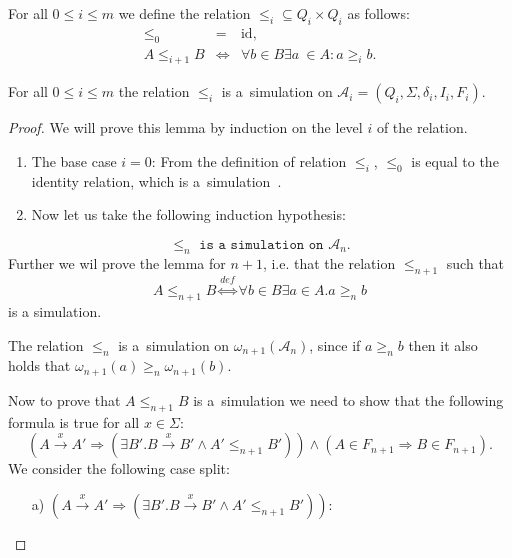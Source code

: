 \begin{defz}\label{simulation-definition}
 For all $0 \leq i \leq m$ we define the relation $\leq_i \subseteq Q_i \times
 Q_i$ as follows:
 \begin{eqnarray}
  \leq_0 & = & \text{id},\\
  A \leq_{i+1} B & \Leftrightarrow & \forall b \in B \exists a~\in A: a \geq_i
  b.
 \end{eqnarray}
\end{defz}

\begin{lemma}
 For all $0 \leq i \leq m$ the relation $\leq_i$ is a~simulation on
 $\mathcal{A}_i = (Q_i, \Sigma, \delta_i, I_i, F_i)$.
\end{lemma}
\begin{proof}
 We will prove this lemma by induction on the level $i$ of the relation.
 
 \begin{enumerate}
   \item The base case $i = 0$: From the definition of relation $\leq_i$,
   $\leq_0$ is equal to the identity relation, which is
   a~simulation~\cite{tacas}.
   \item Now let us take the following induction hypothesis:
 \end{enumerate}
 \begin{equation}
  \leq_n \texttt{ is a simulation on } \mathcal{A}_n.
 \end{equation}
 Further we wil prove the lemma for $n+1$, i.e. that the relation $\leq_{n+1}$
 such that
 \begin{equation}
 A \leq_{n+1} B \overset{\mathit{def}}{\Leftrightarrow} \forall b \in B
 \exists a \in A. a \geq_n b
 \end{equation}
 is a simulation.
 
 The relation $\leq_n$ is a~simulation on $\omega_{n+1}(\mathcal{A}_n)$,
 since if $a \geq_n b$ then it also holds that
 $\omega_{n+1}(a) \geq_n \omega_{n+1}(b)$.
 
 Now to prove that $A \leq_{n+1} B$ is a~simulation we need to show that the
 following formula is true for all $x \in \Sigma$:
 \begin{equation}
 (A \overset{x}{\rightarrow} A' \Rightarrow (\exists B'. B
 \overset{x}{\rightarrow} B' \wedge A' \leq_{n+1} B')) \wedge (A \in F_{n+1}
 \Rightarrow B \in F_{n+1}).
 \end{equation}
 We consider the following case split:
 
 \begin{itemize}
   \item[a)] $(A \overset{x}{\rightarrow} A' \Rightarrow (\exists B'. B
 \overset{x}{\rightarrow} B' \wedge A' \leq_{n+1} B'))$:
 \end{itemize}
 

\end{proof}
